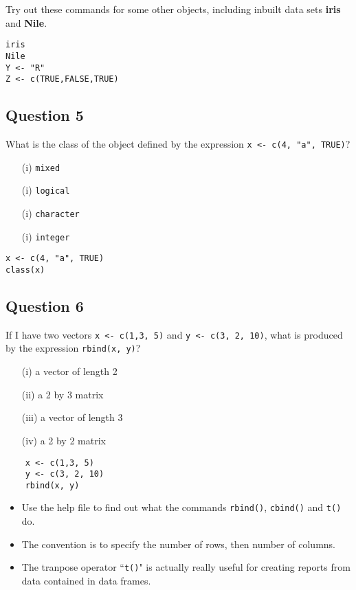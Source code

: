 \documentclass[12pt]{article}
\begin{document}
\noindent Try out these commands for some other objects, including inbuilt data sets \textbf{iris} and \textbf{Nile}.

\begin{framed}
\begin{verbatim}
iris   
Nile
Y <- "R"
Z <- c(TRUE,FALSE,TRUE)
\end{verbatim}
\end{framed}
\newpage
\subsection*{Question 5}
\Large
What is the class of the object defined by the expression \texttt{x <- c(4, "a", TRUE)}?
\begin{itemize}
	\item[(i)] \texttt{mixed}
	\item[(i)] \texttt{logical}
	\item[(i)] \texttt{character}
	\item[(i)] \texttt{integer}
\end{itemize}

\begin{framed}
\begin{verbatim}
x <- c(4, "a", TRUE)
class(x)
\end{verbatim}	
\end{framed}
\newpage
\subsection*{Question 6}
\Large
If I have two vectors \texttt{x <- c(1,3, 5)} and \texttt{y <- c(3, 2, 10)}, what is produced by the expression 
\texttt{rbind(x, y)}?

\begin{itemize}
	\item[(i)] a vector of length 2
	\item[(ii)] a 2 by 3 matrix
	\item[(iii)] a vector of length 3
	\item[(iv)] a 2 by 2 matrix
\end{itemize}

\begin{framed}
	\begin{verbatim}
	x <- c(1,3, 5)
	y <- c(3, 2, 10)
	rbind(x, y)
	\end{verbatim}	
\end{framed}
\begin{itemize}
\item Use the help file to find out what the commands \texttt{rbind()}, \texttt{cbind()} and \texttt{t()} do.
\item The convention is to specify the number of rows, then number of columns.
\item The tranpose operator ``\texttt{t()}" is actually really useful for creating reports from data contained in data frames.
\end{itemize}
\end{document}
